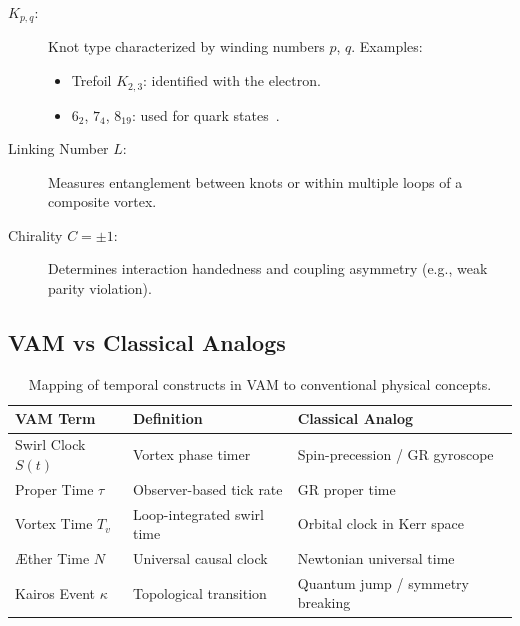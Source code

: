 \documentclass[preprint]{revtex4-2}
\begin{document}
            \begin{description}
                \item[$K_{p,q}$:] Knot type characterized by winding numbers $p$, $q$. Examples:
                \begin{itemize}
                    \item Trefoil $K_{2,3}$: identified with the electron.
                    \item $6_2$, $7_4$, $8_{19}$: used for quark states~\cite{moffatt1969knottedness}.
                \end{itemize}
        
                \item[Linking Number $L$:] Measures entanglement between knots or within multiple loops of a composite vortex.
        
                \item[Chirality $C = \pm 1$:] Determines interaction handedness and coupling asymmetry (e.g., weak parity violation).
            \end{description}
        
            \subsection*{VAM vs Classical Analogs}
        
            \begin{table}[H]
                \centering
                \footnotesize
                \begin{tabular}{|l|l|l|}
                    \hline
                    \textbf{VAM Term} & \textbf{Definition} & \textbf{Classical Analog} \\
                    \hline
                    Swirl Clock $S(t)$ & Vortex phase timer & Spin-precession / GR gyroscope \\
                    Proper Time $\tau$ & Observer-based tick rate & GR proper time \\
                    Vortex Time $T_v$ & Loop-integrated swirl time & Orbital clock in Kerr space \\
                    Æther Time $N$ & Universal causal clock & Newtonian universal time \\
                    Kairos Event $\kappa$ & Topological transition & Quantum jump / symmetry breaking \\
                    \hline
                \end{tabular}
                \caption{Mapping of temporal constructs in VAM to conventional physical concepts.}
            \end{table}
\end{document}
